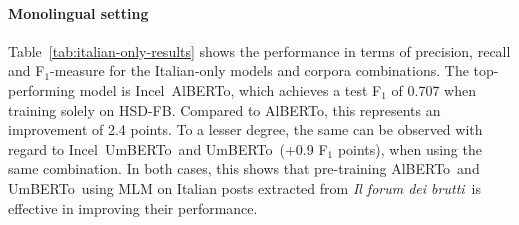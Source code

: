 \documentclass[11pt]{article}
\newcommand{\todoA}[1]{\todo[color=blue!40]{A: #1}}
\newcommand{\umbert}{\mbox{UmBERTo}}
\newcommand{\albert}{\mbox{AlBERTo}}
\newcommand{\iumbert}{\mbox{Incel UmBERTo}}
\newcommand{\ialbert}{\mbox{Incel AlBERTo}}
\newcommand{\hsdfb}{\mbox{HSD-FB}}
\newcommand{\itforum}{\textit{Il forum dei brutti}}
\begin{document}
\paragraph{Monolingual setting}
Table~\ref{tab:italian-only-results} shows the performance in terms of precision, recall and F$_1$-measure for the Italian-only models and corpora combinations.
The top-performing model is \ialbert, which achieves a test F$_1$ of 0.707 when training solely on \hsdfb. Compared to \albert, this represents an improvement of 2.4 points. To a lesser degree, the same can be observed with regard to \iumbert\, and \umbert\, (+0.9 F$_1$ points), when using the same combination. In both cases, this shows that pre-training \albert\, and \umbert\, using MLM on Italian posts extracted from \itforum\, is effective in improving their performance.
\end{document}
